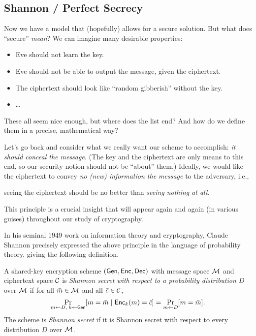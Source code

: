 \documentclass[11pt]{article}
\begin{document}
\subsection{Shannon / Perfect Secrecy}
\label{sec:shannon-perfect-secrecy}

Now we have a model that (hopefully) allows for a secure solution.
But what does ``secure'' \emph{mean}?  We can imagine many desirable
properties:
\begin{itemize}
\item Eve should not learn the key.
\item Eve should not be able to output the message, given the
  ciphertext.
\item The ciphertext should look like ``random gibberish'' without the
  key.
\item \ldots
\end{itemize}
These all seem nice enough, but where does the list end?  And how do
we define them in a precise, mathematical way?

Let's go back and consider what we really want our scheme to
accomplish: \emph{it should conceal the message}.  (The key and the
ciphertext are only means to this end, so our security notion should
not be ``about'' them.)  Ideally, we would like the ciphertext to
convey \emph{no (new) information the message} to the adversary, i.e.,
\begin{center}
  seeing the ciphertext should be no better than \emph{seeing nothing
    at all}.
\end{center}
This principle is a crucial insight that will appear again and again
(in various guises) throughout our study of cryptography.

In his seminal 1949 work on information theory and cryptography,
Claude Shannon precisely expressed the above principle in the language
of probability theory, giving the following definition.

\begin{definition}
  \label{def:shannon-secrecy}
  A shared-key encryption scheme $(\mathsf{Gen},\mathsf{Enc},\mathsf{Dec})$ with
  message space $\mathcal{M}$ and ciphertext space $\mathcal{C}$ is
  \emph{Shannon secret with respect to a probability distribution $D$}
  over $\mathcal{M}$ if for all $\bar{m} \in \mathcal{M}$ and all $\bar{c}
  \in \mathcal{C}$,
  \begin{equation}
    \label{eq:shannon}
    \Pr_{m \gets D,\; k \gets \mathsf{Gen}}[m = \bar{m}\; |\;
    \mathsf{Enc}_{k}(m) = \bar{c} ] = \Pr_{m \gets D}[ m = \bar{m} ].
  \end{equation}
  The scheme is \emph{Shannon secret} if it is Shannon secret with
  respect to every distribution $D$ over $\mathcal{M}$.
\end{definition}
\end{document}
